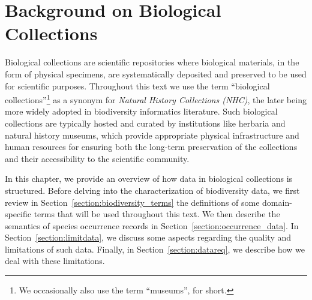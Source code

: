 \chapter{Background on Biological Collections}\label{biodiversity_data}



Biological collections are scientific repositories where biological materials, in the form of physical specimens, are systematically deposited and preserved to be used for scientific purposes. 
Throughout this text we use the term ``biological collections''\footnote{We occasionally also use the term ``museums'', for short.} as a synonym for \textit{Natural History Collections (NHC)}, the later being more widely adopted in biodiversity informatics literature.
Such biological collections are typically hosted and curated by institutions like herbaria and natural history museums, which provide appropriate physical infrastructure and human resources for ensuring both the long-term preservation of the collections and their accessibility to the scientific community.




In this chapter, we provide an overview of how data in biological collections is structured. 
Before delving into the characterization of biodiversity data, we first review in Section~\ref{section:biodiversity_terms} the definitions of some domain-specific terms that will be used throughout this text. We then describe the semantics of species occurrence records in Section~\ref{section:occurrence_data}.
In Section~\ref{section:limitdata}, we discuss some aspects regarding the quality and limitations of such data. Finally, in Section~\ref{section:datareq}, we describe how we deal with these limitations.
 
